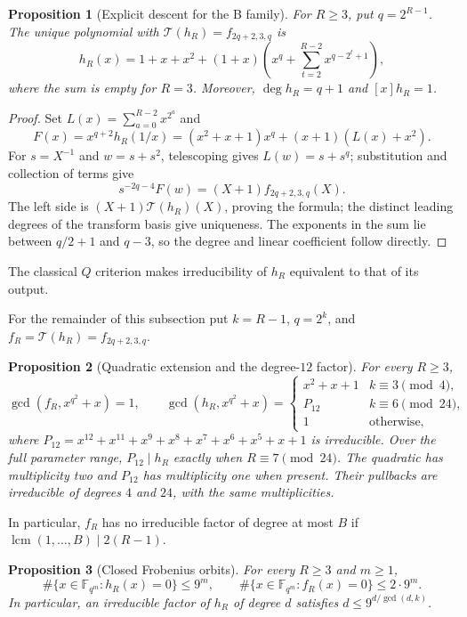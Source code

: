 \documentclass[11pt]{article}
\newtheorem{proposition}{Proposition}[section]
\theoremstyle{definition}
\theoremstyle{remark}
\begin{document}
\begin{proposition}[Explicit descent for the B family]\label{prop:B-descent}
For $R\ge3$, put $q=2^{R-1}$. The unique polynomial with
$\mathcal T(h_R)=f_{2q+2,3,q}$ is
\begin{equation}\label{eq:B-descent}
 h_R(x)=1+x+x^2+(1+x)\left(x^q+
       \sum_{t=2}^{R-2}x^{q-2^t+1}\right),
\end{equation}
where the sum is empty for $R=3$. Moreover, $\deg h_R=q+1$ and
$[x]h_R=1$.
\end{proposition}
\begin{proof}
Set $L(x)=\sum_{a=0}^{R-2}x^{2^a}$ and
\[
 F(x)=x^{q+2}h_R(1/x)
     =(x^2+x+1)x^q+(x+1)(L(x)+x^2).
\]
For $s=X^{-1}$ and $w=s+s^2$, telescoping gives $L(w)=s+s^q$;
substitution and collection of terms give
\[
 s^{-2q-4}F(w)=(X+1)f_{2q+2,3,q}(X).
\]
The left side is $(X+1)\mathcal T(h_R)(X)$, proving the formula;
the distinct leading degrees of the transform basis give uniqueness.
The exponents in the sum lie between $q/2+1$ and $q-3$, so the
degree and linear coefficient follow directly.
\end{proof}
The classical $Q$ criterion makes irreducibility of $h_R$ equivalent
to that of its output.

For the remainder of this subsection put $k=R-1$, $q=2^k$, and
$f_R=\mathcal T(h_R)=f_{2q+2,3,q}$.

\begin{proposition}[Quadratic extension and the degree-$12$ factor]
\label{prop:B-quadratic-extension}
For every $R\ge3$,
\[
 \gcd(f_R,x^{q^2}+x)=1,\qquad
 \gcd(h_R,x^{q^2}+x)=
 \begin{cases}
    x^2+x+1 & k\equiv3\pmod4,\\
    P_{12} & k\equiv6\pmod{24},\\
    1 & \text{otherwise},
 \end{cases}
\]
where $P_{12}=x^{12}+x^{11}+x^9+x^8+x^7+x^6+x^5+x+1$ is
irreducible. Over the full parameter range, $P_{12}\mid h_R$
exactly when $R\equiv7\pmod{24}$. The quadratic has multiplicity
two and $P_{12}$ has multiplicity one when present. Their pullbacks
are irreducible of degrees $4$ and $24$, with the same multiplicities.
\end{proposition}

In particular, $f_R$ has no irreducible factor of degree at most $B$
if $\operatorname{lcm}(1,\ldots,B)\mid 2(R-1)$.

\begin{proposition}[Closed Frobenius orbits]\label{prop:B-closed-orbits}
For every $R\ge3$ and $m\ge1$,
\[
 \#\{x\in\mathbb F_{q^m}:h_R(x)=0\}\le 9^m,\qquad
 \#\{x\in\mathbb F_{q^m}:f_R(x)=0\}\le 2\cdot 9^m.
\]
In particular, an irreducible factor of $h_R$ of degree $d$ satisfies
$d\le 9^{d/\gcd(d,k)}$.
\end{proposition}
\end{document}
